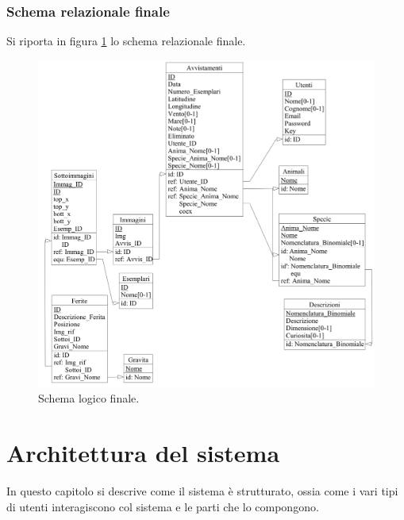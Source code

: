 \documentclass[a4paper,final,12pt]{report}
\begin{document}
\subsection{Schema relazionale finale}
Si riporta in figura \ref{figura:schemarelazionaleFinale} lo schema relazionale finale.
\begin{figure}[hbtp]
\centering
\includegraphics[scale=0.22]{img_concettuale/Logico.png}
\caption{Schema logico finale.}
\label{figura:schemarelazionaleFinale}
\end{figure}

\chapter{Architettura del sistema}
In questo capitolo si descrive come il sistema è strutturato, ossia come i vari tipi di utenti interagiscono col sistema e le parti che lo compongono.
\end{document}
